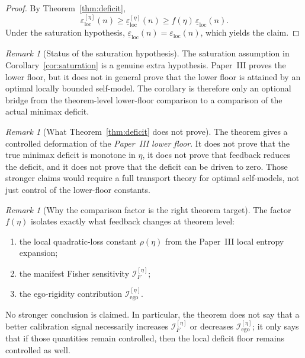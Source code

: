 \documentclass[12pt]{article}
\theoremstyle{definition}
\theoremstyle{remark}
\newtheorem{remark}[theorem]{Remark}
\begin{document}
\begin{proof}
By Theorem~\ref{thm:deficit},
\[
\varepsilon_{\mathrm{loc}}^{[\eta]}(n)
\ge
\underline{\varepsilon}_{\mathrm{loc}}^{[\eta]}(n)
\ge
f(\eta)\,\underline{\varepsilon}_{\mathrm{loc}}(n).
\]
Under the saturation hypothesis,
\(\underline{\varepsilon}_{\mathrm{loc}}(n)=
\varepsilon_{\mathrm{loc}}(n)\), which yields the claim.
\end{proof}

\begin{remark}[Status of the saturation hypothesis]
The saturation assumption in Corollary~\ref{cor:saturation} is a genuine
extra hypothesis. Paper~III proves the lower floor, but it does not in
general prove that the lower floor is attained by an optimal locally
bounded self-model. The corollary is therefore only an optional bridge
from the theorem-level lower-floor comparison to a comparison of the
actual minimax deficit.
\end{remark}

\begin{remark}[What Theorem~\ref{thm:deficit} does not prove]
The theorem gives a controlled deformation of the \emph{Paper~III lower
floor}. It does not prove that the true minimax deficit is monotone in
\(\eta\), it does not prove that feedback reduces the deficit, and it
does not prove that the deficit can be driven to zero. Those stronger
claims would require a full transport theory for optimal self-models,
not just control of the lower-floor constants.
\end{remark}

\begin{remark}[Why the comparison factor is the right theorem target]
The factor \(f(\eta)\) isolates exactly what feedback changes at theorem
level:
\begin{enumerate}
\item the local quadratic-loss constant \(\rho(\eta)\) from the
  Paper~III local entropy expansion;
\item the manifest Fisher sensitivity
  \(\mathcal I_F^{[\eta]}\);
\item the ego-rigidity contribution
  \(\mathcal I_{\mathrm{ego}}^{[\eta]}\).
\end{enumerate}
No stronger conclusion is claimed. In particular, the theorem does not
say that a better calibration signal necessarily increases
\(\mathcal I_F^{[\eta]}\) or decreases
\(\mathcal I_{\mathrm{ego}}^{[\eta]}\); it only says that if those
quantities remain controlled, then the local deficit floor remains
controlled as well.
\end{remark}
\end{document}

